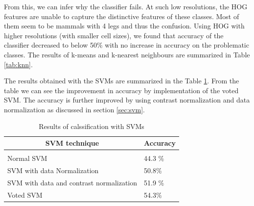 \documentclass{article} %
\begin{document}
        From this, we can infer why the classifier fails. At such low resolutions, the HOG features are unable to capture the distinctive features of these classes. Most of them seem to be mammals with 4 legs and thus the confusion. Using HOG with higher resolutions (with smaller cell sizes), we found that accuracy of the classifier decreased to below 50\% with no increase in accuracy on the problematic classes. The results of k-means and k-nearest neighbours are summarized in Table \ref{tab:knn}.
        
        The results obtained with the SVMs are summarized in the Table \ref{tab:svm}. From the table we can see the improvement in accuracy by implementation of the voted SVM. The accuracy is further improved by using contrast normalization and data normalization as discussed in section \ref{sec:svm}.
        
    
    
    


\begin{table}[t]
    \begin{center}
        \begin{tabular}{ll}
        \multicolumn{1}{c}{\bf SVM technique}  &\multicolumn{1}{c}{\bf Accuracy}
        \\ \hline \\
        Normal SVM         & 44.3 \% \\
        SVM with data Normalization             & 50.8\% \\
        SVM with data and contrast normalization &51.9 \% \\
        Voted SVM	& 54.3\% \\
        \end{tabular}
    \end{center}
    \caption{Results of calssification with SVMs}
    \label{tab:svm}
\end{table}
\end{document}
